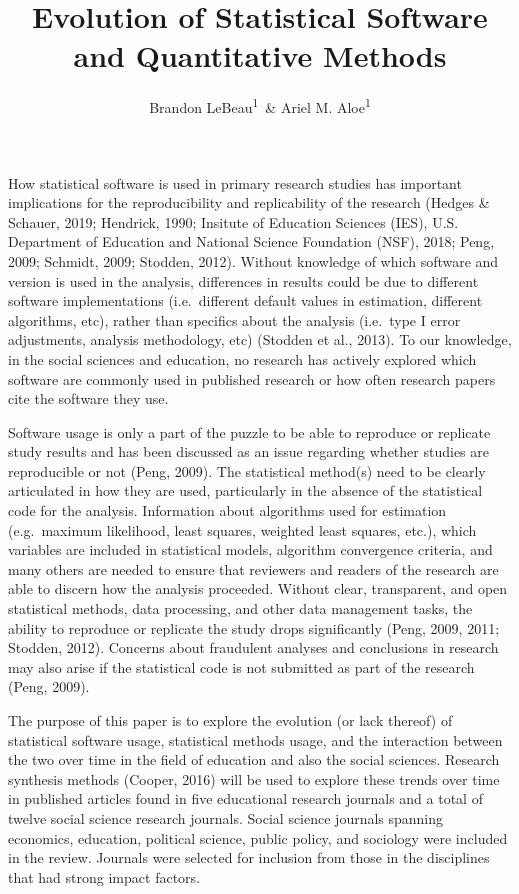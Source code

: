 \documentclass[
  english,
  ,man]{apa6}
\affiliation{
\vspace{0.5cm}
\textsuperscript{1} University of Iowa}
\title{Evolution of Statistical Software and Quantitative Methods}
\author{Brandon LeBeau\textsuperscript{1}~\& Ariel M. Aloe\textsuperscript{1}}
\date{}
\begin{document}
\maketitle

How statistical software is used in primary research studies has important implications for the reproducibility and replicability of the research (Hedges \& Schauer, 2019; Hendrick, 1990; Insitute of Education Sciences (IES), U.S. Department of Education and National Science Foundation (NSF), 2018; Peng, 2009; Schmidt, 2009; Stodden, 2012). Without knowledge of which software and version is used in the analysis, differences in results could be due to different software implementations (i.e.~different default values in estimation, different algorithms, etc), rather than specifics about the analysis (i.e.~type I error adjustments, analysis methodology, etc) (Stodden et al., 2013). To our knowledge, in the social sciences and education, no research has actively explored which software are commonly used in published research or how often research papers cite the software they use.

Software usage is only a part of the puzzle to be able to reproduce or replicate study results and has been discussed as an issue regarding whether studies are reproducible or not (Peng, 2009). The statistical method(s) need to be clearly articulated in how they are used, particularly in the absence of the statistical code for the analysis. Information about algorithms used for estimation (e.g.~maximum likelihood, least squares, weighted least squares, etc.), which variables are included in statistical models, algorithm convergence criteria, and many others are needed to ensure that reviewers and readers of the research are able to discern how the analysis proceeded. Without clear, transparent, and open statistical methods, data processing, and other data management tasks, the ability to reproduce or replicate the study drops significantly (Peng, 2009, 2011; Stodden, 2012). Concerns about fraudulent analyses and conclusions in research may also arise if the statistical code is not submitted as part of the research (Peng, 2009).

The purpose of this paper is to explore the evolution (or lack thereof) of statistical software usage, statistical methods usage, and the interaction between the two over time in the field of education and also the social sciences. Research synthesis methods (Cooper, 2016) will be used to explore these trends over time in published articles found in five educational research journals and a total of twelve social science research journals. Social science journals spanning economics, education, political science, public policy, and sociology were included in the review. Journals were selected for inclusion from those in the disciplines that had strong impact factors.
\end{document}
